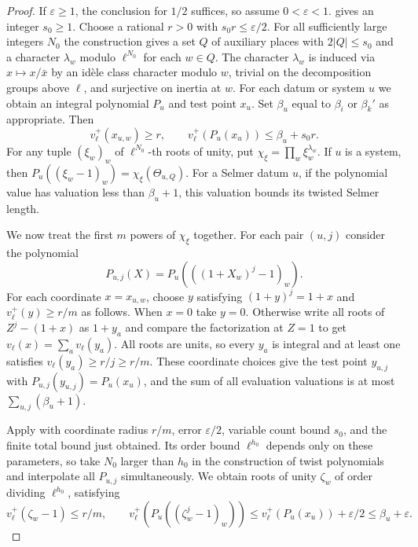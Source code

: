 \begin{proof}
If $\varepsilon\ge1$, the conclusion for $1/2$ suffices, so assume $0<\varepsilon<1$.
 gives an integer $s_0\ge1$. Choose a rational $r>0$ with $s_0r\le\varepsilon/2$. For all sufficiently large integers $N_0$ the construction gives a set $Q$ of auxiliary places with $2|Q|\le s_0$ and a character $\lambda_w$ modulo $\ell^{N_0}$ for each $w\in Q$. The character $\lambda_w$ is induced via $x\mapsto x/\bar x$ by an idèle class character modulo $w$, trivial on the decomposition groups above $\ell$, and surjective on inertia at $w$. For each datum or system $u$ we obtain an integral polynomial $P_u$ and test point $x_u$. Set $\beta_u$ equal to $\beta_i$ or $\beta_k'$ as appropriate. Then
\[
 v_\ell^+(x_{u,w})\ge r,\qquad
 v_\ell^+(P_u(x_u))\le\beta_u+s_0r.
\]
For any tuple $(\xi_w)_w$ of $\ell^{N_0}$-th roots of unity, put $\chi_\xi=\prod_w \xi_w^{\lambda_w}$. If $u$ is a system, then
$P_u((\xi_w-1)_w)=\chi_\xi(\Theta_{u,Q})$. For a Selmer datum $u$, if the polynomial value has valuation less than $\beta_u+1$, this valuation bounds its twisted Selmer length.

We now treat the first $m$ powers of $\chi_\xi$ together. For each pair $(u,j)$ consider the polynomial
\[
 P_{u,j}(X)=P_u(((1+X_w)^j-1)_w).
\]
For each coordinate $x=x_{u,w}$, choose $y$ satisfying $(1+y)^j=1+x$ and $v_\ell^+(y)\ge r/m$ as follows. When $x=0$ take $y=0$. Otherwise write all roots of $Z^j-(1+x)$ as $1+y_a$ and compare the factorization at $Z=1$ to get $v_\ell(x)=\sum_a v_\ell(y_a)$. All roots are units, so every $y_a$ is integral and at least one satisfies $v_\ell(y_a)\ge r/j\ge r/m$.
These coordinate choices give the test point $y_{u,j}$ with $P_{u,j}(y_{u,j})=P_u(x_u)$, and the sum of all evaluation valuations is at most $\sum_{u,j}(\beta_u+1)$.

Apply  with coordinate radius $r/m$, error $\varepsilon/2$, variable count bound $s_0$, and the finite total bound just obtained. Its order bound $\ell^{h_0}$ depends only on these parameters, so take $N_0$ larger than $h_0$ in the construction of twist polynomials and interpolate all $P_{u,j}$ simultaneously. We obtain roots of unity $\zeta_w$ of order dividing $\ell^{h_0}$, satisfying
\[
 v_\ell^+(\zeta_w-1)\le r/m,\qquad
 v_\ell^+(P_u((\zeta_w^j-1)_w))
 \le v_\ell^+(P_u(x_u))+\varepsilon/2
 \le\beta_u+\varepsilon.
\]


\end{proof}

